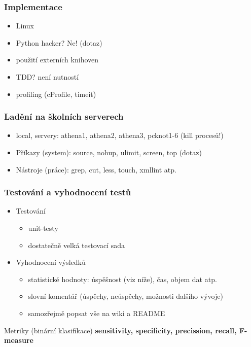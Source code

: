\documentclass{beamer}
\begin{document}
\begin{frame}
  \frametitle{Implementace}
  \begin{itemize}
    \item Linux
    \item Python hacker? Ne! (dotaz)
    \item použití externích knihoven
    \item TDD? není nutností
    \item profiling (cProfile, timeit)
  \end{itemize}
\end{frame}

\begin{frame}
  \frametitle{Ladění na školních serverech}
  \begin{itemize}
    \item local, servery: athena1, athena2, athena3, pcknot1-6 (kill procesů!)
    \item Příkazy (system): source, nohup, ulimit, screen, top (dotaz)
    \item Nástroje (práce): grep, cut, less, touch, xmllint atp.
  \end{itemize}
\end{frame}

\begin{frame}
  \frametitle{Testování a vyhodnocení testů}
  \begin{itemize}
    \item Testování
    \begin{itemize}
      \item unit-testy
      \item dostatečně velká testovací sada
    \end{itemize}
    \item Vyhodnocení výsledků
    \begin{itemize}
      \item statistické hodnoty: úspěšnost (viz níže), čas, objem dat atp.
      \item slovní komentář (úspěchy, neúspěchy, možnosti dalšího  vývoje)
      \item samozřejmě popsat vše na wiki a README
    \end{itemize}
  \end{itemize}
  \begin{block}{Metriky (binární klasifikace)}
    \textbf{sensitivity, specificity, precission, recall, F-measure}
  \end{block}
\end{frame}
\end{document}
